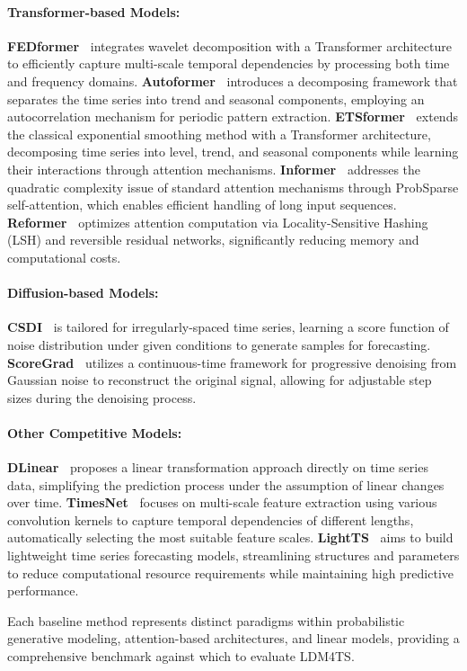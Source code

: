 \paragraph{Transformer-based Models:}
\textbf{FEDformer~\cite{zhou2022fedformer}} integrates wavelet decomposition with a Transformer architecture to efficiently capture multi-scale temporal dependencies by processing both time and frequency domains. 
\textbf{Autoformer~\cite{wu2021autoformer}} introduces a decomposing framework that separates the time series into trend and seasonal components, employing an autocorrelation mechanism for periodic pattern extraction.
\textbf{ETSformer~\cite{woo2022etsformer}} extends the classical exponential smoothing method with a Transformer architecture, decomposing time series into level, trend, and seasonal components while learning their interactions through attention mechanisms.
\textbf{Informer~\cite{zhou2021informer}} addresses the quadratic complexity issue of standard attention mechanisms through ProbSparse self-attention, which enables efficient handling of long input sequences.
\textbf{Reformer~\cite{kitaev2020reformer}} optimizes attention computation via Locality-Sensitive Hashing (LSH) and reversible residual networks, significantly reducing memory and computational costs.
\paragraph{Diffusion-based Models:}
\textbf{CSDI~\cite{tashiro2021csdi}} is tailored for irregularly-spaced time series, learning a score function of noise distribution under given conditions to generate samples for forecasting.
\textbf{ScoreGrad~\cite{song2020score}} utilizes a continuous-time framework for progressive denoising from Gaussian noise to reconstruct the original signal, allowing for adjustable step sizes during the denoising process.
\paragraph{Other Competitive Models:}
\textbf{DLinear~\cite{zeng2023transformers}} proposes a linear transformation approach directly on time series data, simplifying the prediction process under the assumption of linear changes over time.
\textbf{TimesNet~\cite{wu2022timesnet}} focuses on multi-scale feature extraction using various convolution kernels to capture temporal dependencies of different lengths, automatically selecting the most suitable feature scales.
\textbf{LightTS~\cite{campos2023lightts}} aims to build lightweight time series forecasting models, streamlining structures and parameters to reduce computational resource requirements while maintaining high predictive performance.

Each baseline method represents distinct paradigms within probabilistic generative modeling, attention-based architectures, and linear models, providing a comprehensive benchmark against which to evaluate LDM4TS.